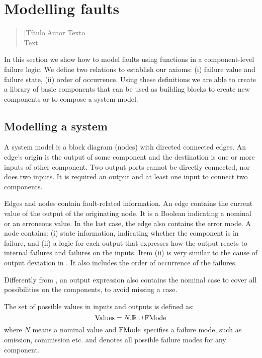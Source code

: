 \chapter{Modelling faults}
\label{sec:fault-modelling}

\begin{quotation}[Título]{Autor}
Texto \\
Text
\end{quotation}

In this section we show how to model faults using functions in a component-level failure logic.
%
We define two relations to establish our axioms: (i) failure value and failure state, (ii) order of occurrence.
%
Using these definitions we are able to create a library of basic components that can be used as building blocks to create new components or to compose a system model.

\section{Modelling a system}
\label{sec:modelling-a-system}

A system model is a block diagram (nodes) with directed connected edges. 
%
An edge's origin is the output of some component and the destination is one or more inputs of other component.
%
Two output ports cannot be directly connected, nor does two inputs.
%
It is required an output and at least one input to connect two components.

Edges and nodes contain fault-related information.
%
An edge contains the current value of the output of the originating node.
%
It is a Boolean indicating a nominal or an erroneous value. 
%
In the last case, the edge also contains the error mode.
%
A node contains: (i) state information, indicating whether the component is in failure, and (ii) a logic for each output that expresses how the output reacts to internal failures and failures on the inputs. 
%
Item (ii) is very similar to the cause of output deviation in .
%
It also includes the order of occurrence of the failures.

Differently from \HIPHOPS, an output expression also contains the nominal case to cover all possibilities on the components, to avoid missing a case.

\begin{definition}[Values]
The set of possible values in inputs and outputs is defined as: 
\[\mathrm{Values}=N.\mathbb{R} \cup \mathrm{FMode}\]
%
where $N$ means a nominal value and $\mathrm{FMode}$ specifies a failure mode, such as omission, commission etc. and denotes all possible failure modes for any component.
\end{definition}

